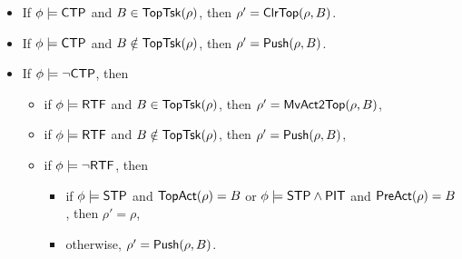 

\noindent \fbox{$\phi \models \neg \ntkflag\wedge\neg\ndmflag$}
	\begin{itemize}
		\item If $\phi \models {\sf CTP}$ and $B \in \mathsf{TopTsk}(\rho)$, then $\rho' = \mathsf{ClrTop}(\rho, B)$.
		\item If $\phi \models {\sf CTP}$ and $B \notin \mathsf{TopTsk}(\rho)$, then $\rho' = \mathsf{Push}(\rho, B)$.
		\item If $\phi \models \neg {\sf CTP}$, then
		\begin{itemize}
			\item if $\phi \models {\sf RTF}$ and $B \in \mathsf{TopTsk}(\rho)$, then $\rho'= \mathsf{MvAct2Top}(\rho, B)$, 
			\item if $\phi \models {\sf RTF}$ and $B \notin \mathsf{TopTsk}(\rho)$, then $\rho' = \mathsf{Push}(\rho, B)$, 
			\item if $\phi \models \neg {\sf RTF}$, then
			\begin{itemize}
				\item if $\phi \models {\sf STP}$ and $\mathsf{TopAct}(\rho) = B$ or $\phi \models {\sf STP}\wedge{\sf PIT}$ and $\mathsf{PreAct}(\rho) = B$, then $\rho' = \rho$,
				\item otherwise, $\rho' = \mathsf{Push}(\rho, B)$.
			\end{itemize}
		\end{itemize}
\end{itemize}


